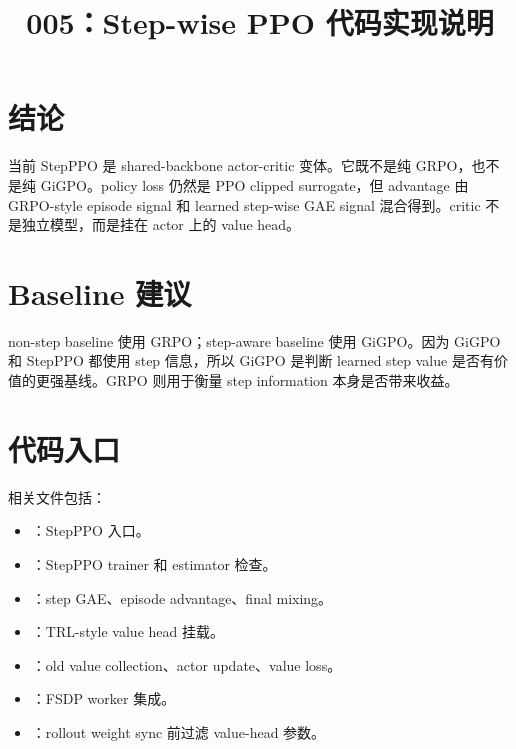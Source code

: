 \documentclass[10pt]{ctexart}
\title{005：Step-wise PPO 代码实现说明}
\author{}
\date{}
\begin{document}
\maketitle
\vspace{-1.2em}

\section*{结论}
当前 StepPPO 是 shared-backbone actor-critic 变体。它既不是纯 GRPO，也不是纯 GiGPO。policy loss 仍然是 PPO clipped surrogate，但 advantage 由 GRPO-style episode signal 和 learned step-wise GAE signal 混合得到。critic 不是独立模型，而是挂在 actor 上的 value head。

\section*{Baseline 建议}
non-step baseline 使用 GRPO；step-aware baseline 使用 GiGPO。因为 GiGPO 和 StepPPO 都使用 step 信息，所以 GiGPO 是判断 learned step value 是否有价值的更强基线。GRPO 则用于衡量 step information 本身是否带来收益。

\section*{代码入口}
相关文件包括：
\begin{itemize}
\item {}：StepPPO 入口。
\item {}：StepPPO trainer 和 estimator 检查。
\item {}：step GAE、episode advantage、final mixing。
\item {}：TRL-style value head 挂载。
\item {}：old value collection、actor update、value loss。
\item {}：FSDP worker 集成。
\item {}：rollout weight sync 前过滤 value-head 参数。
\end{itemize}
\end{document}
